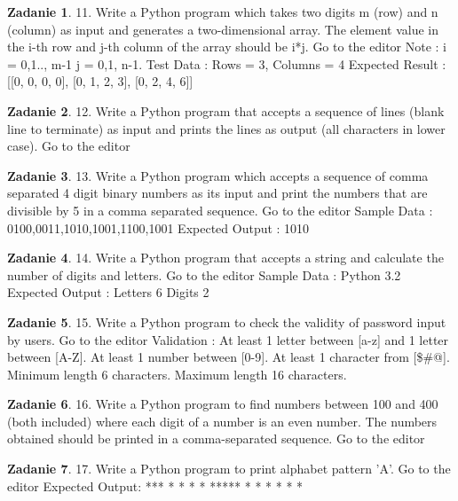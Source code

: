 \documentclass[11pt]{article}
\theoremstyle{definition}
\newtheorem{zadanie}{Zadanie}
\begin{document}
\begin{zadanie}
11. Write a Python program which takes two digits m (row) and n (column) as input and generates a two-dimensional array. The element value in the i-th row and j-th column of the array should be i*j. Go to the editor
Note :
i = 0,1.., m-1
j = 0,1, n-1.
Test Data : Rows = 3, Columns = 4
Expected Result : [[0, 0, 0, 0], [0, 1, 2, 3], [0, 2, 4, 6]]
\end{zadanie}

\begin{zadanie}
12. Write a Python program that accepts a sequence of lines (blank line to terminate) as input and prints the lines as output (all characters in lower case). Go to the editor
\end{zadanie}

\begin{zadanie}
13. Write a Python program which accepts a sequence of comma separated 4 digit binary numbers as its input and print the numbers that are divisible by 5 in a comma separated sequence. Go to the editor
Sample Data : 0100,0011,1010,1001,1100,1001
Expected Output : 1010
\end{zadanie}

\begin{zadanie}
14. Write a Python program that accepts a string and calculate the number of digits and letters. Go to the editor
Sample Data : Python 3.2
Expected Output :
Letters 6
Digits 2
\end{zadanie}

\begin{zadanie}
15. Write a Python program to check the validity of password input by users. Go to the editor
Validation :
At least 1 letter between [a-z] and 1 letter between [A-Z].
At least 1 number between [0-9].
At least 1 character from [\$\#@].
Minimum length 6 characters.
Maximum length 16 characters.
\end{zadanie}

\begin{zadanie}
16. Write a Python program to find numbers between 100 and 400 (both included) where each digit of a number is an even number. The numbers obtained should be printed in a comma-separated sequence. Go to the editor
\end{zadanie}

\begin{zadanie}
17. Write a Python program to print alphabet pattern 'A'. Go to the editor
Expected Output:
***
*   *
*   *
*****
*   *
*   *
*   *
\end{zadanie}
\end{document}
